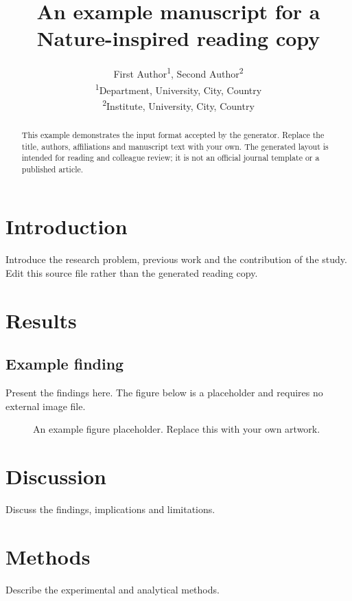 \documentclass{article}
\title{An example manuscript for a Nature-inspired reading copy}
\author{First Author\textsuperscript{1}, Second Author\textsuperscript{2}\\
\small\textsuperscript{1}Department, University, City, Country\\
\small\textsuperscript{2}Institute, University, City, Country}
\date{}
\begin{document}
\maketitle
\begin{abstract}
This example demonstrates the input format accepted by the generator.
Replace the title, authors, affiliations and manuscript text with your own.
The generated layout is intended for reading and colleague review; it is
not an official journal template or a published article.
\end{abstract}

\section{Introduction}
Introduce the research problem, previous work and the contribution of the study.
Edit this source file rather than the generated reading copy.

\section{Results}
\subsection{Example finding}
Present the findings here. The figure below is a placeholder and requires
no external image file.

\begin{figure}[htbp]
\centering
\fbox{\rule{0pt}{35mm}\rule{0.85\textwidth}{0pt}}
\caption{An example figure placeholder. Replace this with your own artwork.}
\label{fig:example}
\end{figure}

\section{Discussion}
Discuss the findings, implications and limitations.

\section{Methods}
Describe the experimental and analytical methods.
\end{document}
